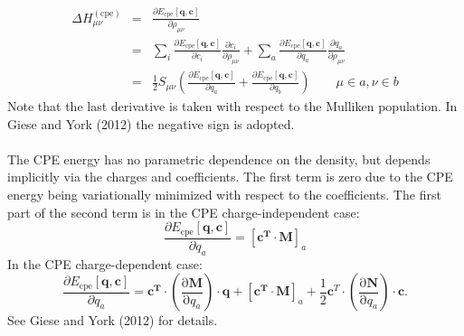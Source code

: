 \documentclass{article}
\numberwithin{equation}{section}
\begin{document}
\begin{eqnarray}
    \Delta H_{\mu\nu}^{\mathrm{(cpe)}} &=& \frac{\partial E_{\mathrm{cpe}}\left[\mathbf{q}, \mathbf{c}\right]}{\partial \rho_{\mu\nu}}\\
    &=& \sum_i \frac{\partial E_{\mathrm{cpe}}\left[\mathbf{q}, \mathbf{c}\right]}{\partial c_i} 
    \frac{\partial c_i}{\partial \rho_{\mu\nu}}
    + \sum_a \frac{\partial E_{\mathrm{cpe}}\left[\mathbf{q}, \mathbf{c}\right]}{\partial q_a} 
    \frac{\partial q_a}{\partial \rho_{\mu\nu}}\\
    &=& \frac{1}{2} S_{\mu\nu} \left(
    \frac{\partial E_{\mathrm{cpe}}\left[\mathbf{q}, \mathbf{c}\right]}{\partial q_a} +
    \frac{\partial E_{\mathrm{cpe}}\left[\mathbf{q}, \mathbf{c}\right]}{\partial q_b}
\right) \qquad \mu \in a, \nu \in b
\end{eqnarray}
Note that the last derivative is taken with respect to the Mulliken population. In Giese and York (2012) the negative sign is adopted.
\\\\The CPE energy has no parametric dependence on the density, but depends implicitly via the charges and coefficients.
The first term is zero due to the CPE energy being variationally minimized with respect to the coefficients.
The first part of the second term is in the CPE charge-independent case:
\begin{equation}
    \frac{\partial E_{\mathrm{cpe}}\left[\mathbf{q}, \mathbf{c}\right]}{\partial q_a} = [\mathbf{c^T}  \cdot \mathbf{M}]_a
\end{equation}
In the CPE charge-dependent case:
\begin{equation}
    \frac{\partial E_{\mathrm{cpe}}\left[\mathbf{q}, \mathbf{c}\right]}{\partial q_a} = 
    \mathbf{c^T} \cdot \left( \frac{\mathrm{\partial}\mathbf{M}}{\mathrm{\partial}q_a}\right) \cdot \mathbf{q} 
    + [\mathbf{c^T}  \cdot \mathbf{M}]_a + \frac{1}{2}\mathbf{c}^T \cdot \left( \frac{\mathrm{\partial}\mathbf{N}}{\mathrm{\partial}q_a}\right) \cdot \mathbf{c}. 
\end{equation}
See Giese and York (2012) for details.\cite{gieseyork2012}
\end{document}
